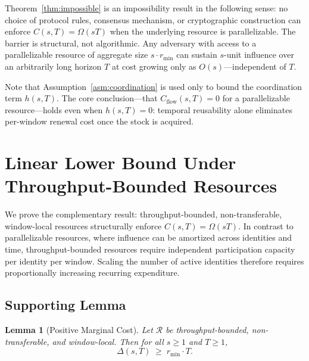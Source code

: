 \documentclass[10pt,journal,compsoc]{IEEEtran}
\newtheorem{lemma}[theorem]{Lemma}
\theoremstyle{remark}
\begin{document}
	Theorem~\ref{thm:impossible} is an impossibility result
	in the following sense: no choice of protocol rules,
	consensus mechanism, or cryptographic construction can
	enforce $C(s,T) = \Omega(sT)$ when the underlying
	resource is parallelizable.
	The barrier is structural, not algorithmic.
	Any adversary with access to a parallelizable resource
	of aggregate size $s \cdot r_{\min}$ can sustain
	$s$-unit influence over an arbitrarily long horizon
	$T$ at cost growing only as $O(s)$---independent of $T$.
	
	Note that Assumption~\ref{asm:coordination} is used
	only to bound the coordination term $h(s,T)$.
	The core conclusion---that $C_{\mathrm{flow}}(s,T) = 0$
	for a parallelizable resource---holds even when
	$h(s,T) = 0$: temporal reusability alone eliminates
	per-window renewal cost once the stock is acquired.
	
	\section{Linear Lower Bound Under Throughput-Bounded Resources}
	\label{sec:lowerbound}
	
	We prove the complementary result: throughput-bounded,
	non-transferable, window-local resources structurally
	enforce $C(s,T) = \Omega(sT)$.
	In contrast to parallelizable resources, where influence
	can be amortized across identities and time, throughput-bounded
	resources require independent participation capacity
	per identity per window.
	Scaling the number of active identities therefore
	requires proportionally increasing recurring expenditure.
	
	\subsection{Supporting Lemma}
	\label{ssec:lemma_linear}
	
	\begin{lemma}[Positive Marginal Cost]
		\label{lem:positive_marginal}
		Let $\mathcal{R}$ be throughput-bounded,
		non-transferable, and window-local.
		Then for all $s \geq 1$ and $T \geq 1$,
		\begin{equation}
			\Delta(s, T) \;\geq\; r_{\min} \cdot T.
		\end{equation}
	\end{lemma}
	
\end{document}
